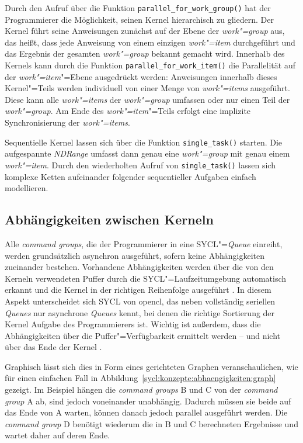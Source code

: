 Durch den Aufruf über die Funktion \texttt{parallel\_for\_work\_group()} hat der
Programmierer die Möglichkeit, seinen Kernel hierarchisch zu gliedern. Der
Kernel führt seine Anweisungen zunächst auf der Ebene der \textit{work"=group}
aus, das heißt, dass jede Anweisung von einem einzigen \textit{work"=item}
durchgeführt und das Ergebnis der gesamten \textit{work"=group} bekannt gemacht
wird. Innerhalb des Kernels kann durch die Funktion
\texttt{parallel\_for\_work\_item()} die Parallelität auf der
\textit{work"=item}"=Ebene ausgedrückt werden: Anweisungen innerhalb dieses
Kernel"=Teils werden individuell von einer Menge von \textit{work"=items}
ausgeführt. Diese kann alle \textit{work"=items} der \textit{work"=group}
umfassen oder nur einen Teil der \textit{work"=group}. Am Ende des
\textit{work"=item}"=Teils erfolgt eine implizite Synchronisierung der
\textit{work"=items}.

Sequentielle Kernel lassen sich über die Funktion \texttt{single\_task()}
starten. Die aufgespannte \textit{NDRange} umfasst dann genau eine
\textit{work"=group} mit genau einem \textit{work"=item}. Durch den wiederholten
Aufruf von \texttt{single\_task()} lassen sich komplexe Ketten aufeinander
folgender sequentieller Aufgaben einfach modellieren.

\subsection{Abhängigkeiten zwischen Kerneln}
\label{sycl:konzepte:abhaengigkeiten}

Alle \textit{command groups}, die der Programmierer in eine
SYCL"=\textit{Queue} einreiht, werden grundsätzlich asynchron ausgeführt, sofern
keine Abhängigkeiten zueinander bestehen. Vorhandene Abhängigkeiten werden über
die von den Kerneln verwendeten Puffer durch die SYCL"=Laufzeitumgebung
automatisch erkannt und die Kernel in der richtigen Reihenfolge ausgeführt
\cite[vgl.][21--23]{sycl2019}. In diesem Aspekt unterscheidet sich SYCL von
\gls{opencl}, das neben vollständig seriellen \textit{Queues} nur asynchrone
\textit{Queues} kennt, bei denen die richtige Sortierung der Kernel Aufgabe des
Programmierers ist. Wichtig ist außerdem, dass die Abhängigkeiten über die
Puffer"=Verfügbarkeit ermittelt werden -- und nicht über das Ende der Kernel
\cite[vgl.][166]{sycl2019}.

Graphisch lässt sich dies in Form eines gerichteten Graphen veranschaulichen,
wie für einen einfachen Fall in
Abbildung~\ref{sycl:konzepte:abhaengigkeiten:graph} gezeigt. Im Beispiel hängen
die \textit{command groups} B und C von der \textit{command group} A ab, sind
jedoch voneinander unabhängig. Dadurch müssen sie beide auf das Ende von A
warten, können danach jedoch parallel ausgeführt werden. Die
\textit{command group} D benötigt wiederum die in B und C berechneten
Ergebnisse und wartet daher auf deren Ende.

